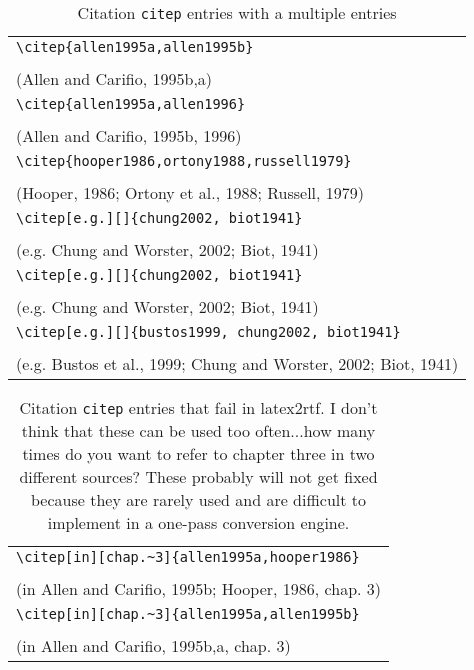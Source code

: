 \documentclass{article}
\begin{document}
\begin{table}
\begin{center}
\begin{tabular}{l}
	\verb#\citep{allen1995a,allen1995b}# \\
	\citep{allen1995a,allen1995b} \\
	(Allen and Carifio, 1995b,a) \\
\hline
	\verb#\citep{allen1995a,allen1996}# \\
	\citep{allen1995a,allen1996} \\
	(Allen and Carifio, 1995b, 1996) \\
\hline
	\verb#\citep{hooper1986,ortony1988,russell1979}# \\
	\citep{hooper1986,ortony1988,russell1979}  \\
	(Hooper, 1986; Ortony et al., 1988; Russell, 1979)\\
 \hline
	\verb#\citep[e.g.][]{chung2002, biot1941}#\\
	\citep[e.g.][]{chung2002, biot1941} \\
	(e.g. Chung and Worster, 2002; Biot, 1941)\\
 \hline
	\verb#\citep[e.g.][]{chung2002, biot1941}#\\
	\citep[e.g.][]{chung2002, biot1941} \\
	(e.g. Chung and Worster, 2002; Biot, 1941)\\
 \hline
	\verb#\citep[e.g.][]{bustos1999, chung2002, biot1941}#\\
	\citep[e.g.][]{bustos1999, chung2002, biot1941} \\
	(e.g. Bustos et al., 1999; Chung and Worster, 2002; Biot, 1941)\\
\end{tabular}
\end{center}
\caption{Citation \texttt{citep} entries with a multiple entries}
\end{table}

\begin{table}
\begin{center}
\begin{tabular}{l}
	\verb#\citep[in][chap.~3]{allen1995a,hooper1986}# \\
	\citep[in][chap.~3]{allen1995a,hooper1986} \\
	(in Allen and Carifio, 1995b; Hooper, 1986, chap. 3)\\
\hline
	\verb#\citep[in][chap.~3]{allen1995a,allen1995b}# \\
	\citep[in][chap.~3]{allen1995a,allen1995b} \\
	(in Allen and Carifio, 1995b,a, chap. 3)\\
\end{tabular}
\end{center}
\caption{Citation \texttt{citep} entries that fail in latex2rtf.  I don't think
that these can be used too often...how many times do you want to refer to chapter
three in two different sources?  These probably will not get fixed because they
are rarely used and are difficult to implement in a one-pass conversion engine.}
\end{table}
\end{document}
